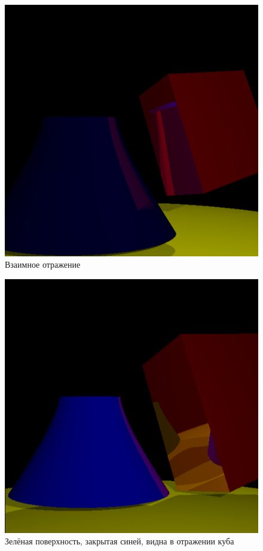\documentclass[12pt]{report}
\begin{document}
\begin{figure}[h!p]
	\centering
	\includegraphics[scale = 0.6]{1.png}
	\caption{Взаимное отражение}
	\label{fig:test1}
\end{figure}
\begin{figure}[h!p]
	\centering
	\includegraphics[scale = 0.6]{2.png}
	\caption{Зелёная поверхность, закрытая синей, видна в отражении куба}
	\label{fig:test2}
\end{figure}
\end{document}
